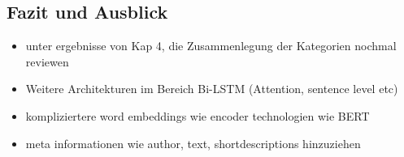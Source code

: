 \documentclass[a4paper,11pt]{article}
\begin{document}
\subsection{Fazit und Ausblick}

\begin{itemize}
\item unter ergebnisse von Kap 4, die Zusammenlegung der Kategorien nochmal reviewen
    \item Weitere Architekturen im Bereich Bi-LSTM (Attention, sentence level etc)
    \item kompliziertere word embeddings wie encoder technologien wie BERT
    \item meta informationen wie author, text, shortdescriptions hinzuziehen
\end{itemize}


\newpage
\end{document}
